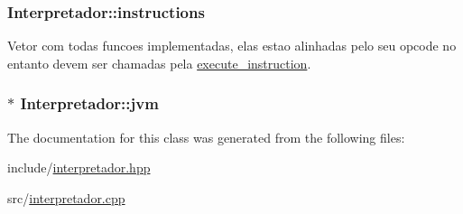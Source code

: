 \hypertarget{classInterpretador_a97cef3f8602b524716643a0395da46fe}{
\subsubsection[{instructions}]{\setlength{\rightskip}{0pt plus 5cm}Interpretador\+::instructions\hspace{0.3cm}{\ttfamily [private]}}}\label{classInterpretador_a97cef3f8602b524716643a0395da46fe}


Vetor com todas funcoes implementadas, elas estao alinhadas pelo seu opcode no entanto devem ser chamadas pela \hyperlink{classInterpretador_a2bec82447756b2f6a43e68164ddbdde1}{execute\+\_\+instruction}. 

\hypertarget{classInterpretador_aed3bd481ff345333414aa70360a94b7c}{
\subsubsection[{jvm}]{$\ast$ Interpretador\+::jvm\hspace{0.3cm}{\ttfamily [private]}}}\label{classInterpretador_aed3bd481ff345333414aa70360a94b7c}


The documentation for this class was generated from the following files\+:\begin{DoxyCompactItemize}
\item 
include/\hyperlink{interpretador_8hpp}{interpretador.\+hpp}\item 
src/\hyperlink{interpretador_8cpp}{interpretador.\+cpp}\end{DoxyCompactItemize}

